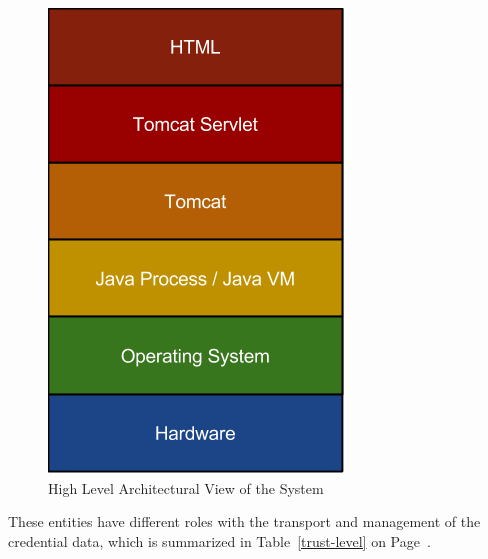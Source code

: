 \documentclass[11pt, a4paper, notitlepage]{article}
\begin{document}
\begin{figure}[h!]
    \centering
    \includegraphics[height=0.3\paperheight]{high-level-archecuture}
    \caption{High Level Architectural View of the System}
\end{figure}

These entities have different roles with the transport and management of the credential data, which is summarized in Table~\ref{trust-level} on Page~\pageref{trust-level}. 
\end{document}
